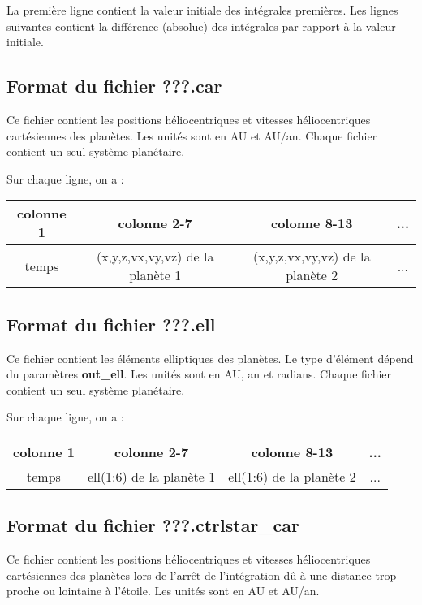 \documentclass[11pt]{article}
\begin{document}
La premi\`ere ligne contient la valeur initiale des int\'egrales premi\`eres. Les lignes suivantes contient la différence (absolue) des intégrales par rapport à la valeur initiale.


\subsection{Format du fichier {\bf ???.car} }

Ce fichier contient les positions h\'eliocentriques et vitesses h\'eliocentriques cart\'esiennes des plan\`etes. Les unit\'es sont en AU et AU/an.
Chaque fichier contient un seul syst\`eme plan\'etaire.


Sur chaque ligne, on a : 

\begin{tabular}{|c|c|c|c|} \hline
colonne 1 &   colonne 2-7 & colonne 8-13 & ... \\ \hline
temps & (x,y,z,vx,vy,vz) de la plan\`ete 1  & (x,y,z,vx,vy,vz) de la plan\`ete 2 & ... \\    \hline
\end{tabular}

\subsection{Format du fichier {\bf ???.ell} }

Ce fichier contient les \'el\'ements elliptiques des plan\`etes. Le type d'\'el\'ement d\'epend du param\`etres  {\bf out\_ell}. Les unit\'es sont en AU, an et radians.
Chaque fichier contient un seul syst\`eme plan\'etaire.

Sur chaque ligne, on a : 

\begin{tabular}{|c|c|c|c|} \hline
colonne 1 &   colonne 2-7 & colonne 8-13 & ... \\ \hline
temps & ell(1:6) de la plan\`ete 1  & ell(1:6) de la plan\`ete 2 & ... \\    \hline
\end{tabular}


\subsection{Format du fichier  {\bf ???.ctrlstar\_car}}

Ce fichier contient les positions h\'eliocentriques et vitesses h\'eliocentriques cart\'esiennes des plan\`etes lors de l'arr\^et de l'int\'egration d\^u \`a une distance trop proche ou lointaine \`a l'\'etoile. Les unit\'es sont en AU et AU/an.
\end{document}

